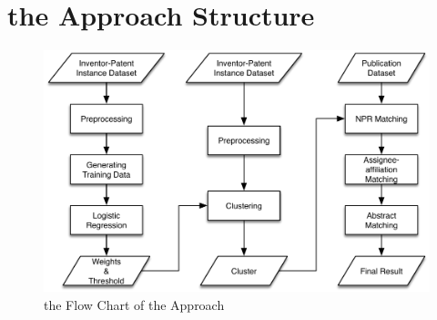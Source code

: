 \section{the Approach Structure}
\begin{figure}
\centering
\includegraphics[width=\headwidth]{FlowChart.pdf}
\caption{the Flow Chart of the Approach}
\end{figure}
